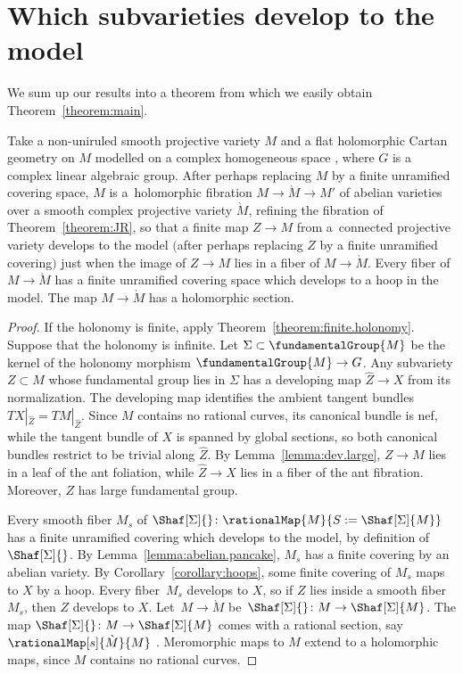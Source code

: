\section{Which subvarieties develop to the model}
We sum up our results into a theorem from which we easily obtain Theorem~\ref{theorem:main}.
\begin{Theorem}\label{theorem:big.1}
Take a non-uniruled smooth projective variety $M$ and a flat holomorphic Cartan geometry on $M$ modelled on a complex homogeneous space , where $G$ is a complex linear algebraic group.
After perhaps replacing $M$ by a finite unramified covering space, $M$ is a~holomorphic fibration $M \to \grave{M}
 \longrightarrow
 M'$ of abelian varieties over a smooth complex projective variety $\grave{M}$, refining the fibration of Theorem~{\rm\ref{theorem:JR}}, so that a finite map $Z \longrightarrow
 M$ from a~connected projective variety develops to the model $($after perhaps replacing $Z$ by a finite unramified covering$)$ just when the image of $Z \longrightarrow
 M$ lies in a fiber of $M \longrightarrow \grave{M}$.
Every fiber of~${M \to \grave{M}}$ has a finite unramified covering space which develops to a hoop in the model.
The map $M \to \grave{M}$ has a holomorphic section.
\end{Theorem}

\begin{proof}
If the holonomy is finite, apply Theorem~\ref{theorem:finite.holonomy}.
Suppose that the holonomy is infinite.
Let $\Sigma \subset \fundamentalGroup{M}$ be the kernel of the holonomy morphism $\fundamentalGroup{M} \to G$.
Any subvariety $Z \subset M$ whose fundamental group lies in $\Sigma$ has a developing map $\widehat{Z} \longrightarrow
 X$ from its normalization.
The developing map identifies the ambient tangent bundles $ TX|_{\widehat{Z}} = TM|_{\widehat{Z}}$.
Since $M$ contains no rational curves, its canonical bundle is nef, while the tangent bundle of $X$ is spanned by global sections, so both canonical bundles restrict to be trivial along $\widehat{Z}$.
By Lemma~\ref{lemma:dev.large}, $Z \to M$ lies in a leaf of the ant foliation, while $\widehat{Z} \to X$ lies in a fiber of the ant fibration.
Moreover, $Z$ has large fundamental group.

Every smooth fiber $M_{s}$ of $\Shaf[\Sigma]{} \colon \rationalMap{M}{S := \Shaf[\Sigma]{M}}$ has a finite unramified covering which develops to the model, by definition of $\Shaf[\Sigma]{}$.
By Lemma~\ref{lemma:abelian.pancake}, $M_{s}$ has a finite covering by an abelian variety.
By Corollary~\ref{corollary:hoops}, some finite covering of $M_{s}$ maps to $X$ by a hoop.
Every fiber~$M_{s}$ develops to $X$, so if $Z$ lies inside a smooth fiber $M_{s}$, then $Z$ develops to $X$.
Let~${M \to \grave{M}}$ be~${\Shaf[\Sigma]{}\colon M \to \Shaf[\Sigma]{M}}$.
The map $\Shaf[\Sigma]{} \colon M \to \Shaf[\Sigma]{M}$ comes with a rational section,
say $\rationalMap[s]{\grave{M}}{M}$ \cite[Theorem~6.3]{Kollar:1993}.
Meromorphic maps to $M$ extend to a holomorphic maps, since $M$ contains no rational curves.
\end{proof}
